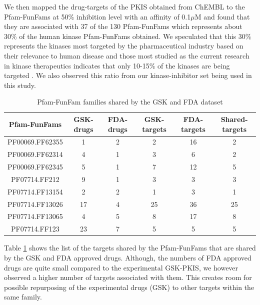 \documentclass[a4paper, 11pt]{article}
\newcommand{\redcomment}[1]{\textcolor{red}{[#1]}} %
\begin{document}
We then mapped the drug-targets of the PKIS obtained from ChEMBL to the Pfam-FunFams at 50\% inhibition level with an affinity of 0.1$\mu$M and found that they are associated with 37 of the 130 Pfam-FunFams which represents about 30\% of the human kinase Pfam-FunFams obtained. We speculated that this 30\% represents the kinases most targeted by the pharmaceutical industry based on their relevance to human disease and those most studied as the current research in kinase therapeutics indicates that only 10-15\% of the kinases are being targeted \cite{li2016human, elkins2016comprehensive}. We also observed this ratio from our kinase-inhibitor set being used in this study.


\begin{table}[H]
\centering
\caption{Pfam-FunFam families shared by the GSK and FDA dataset}
\label{drgfam}
\begin{tabular}{|c|c|c|c|c|c|}
\hline
Pfam-FunFams    & GSK-drugs & FDA-drugs & GSK-targets & FDA-targets & Shared-targets \\ \hline
PF00069.FF62355 & 1   & 2   & 2           & 16          & 2              \\ \hline
PF00069.FF62314 & 4   & 1   & 3           & 6           & 2              \\ \hline
PF00069.FF62345 & 5   & 1   & 7           & 12          & 5              \\ \hline
PF07714.FF212   & 9   & 1   & 3           & 3           & 3              \\ \hline
PF07714.FF13154 & 2   & 2   & 1           & 3           & 1              \\ \hline
PF07714.FF13026 & 17  & 4   & 25          & 36          & 25             \\ \hline
PF07714.FF13065 & 4   & 5   & 8           & 17          & 8              \\ \hline
PF07714.FF123   & 23  & 7   & 5           & 5           & 5              \\ \hline
\end{tabular}
\end{table}
Table \ref{drgfam} shows the list of the targets shared by the Pfam-FunFams that are shared by the GSK and FDA approved drugs. Although, the numbers of FDA approved drugs are quite small compared to the experimental GSK-PKIS, we however observed a higher number of targets associated with them. This creates room for possible repurposing of the experimental drugs (GSK) to other targets within the same family.
\end{document}
